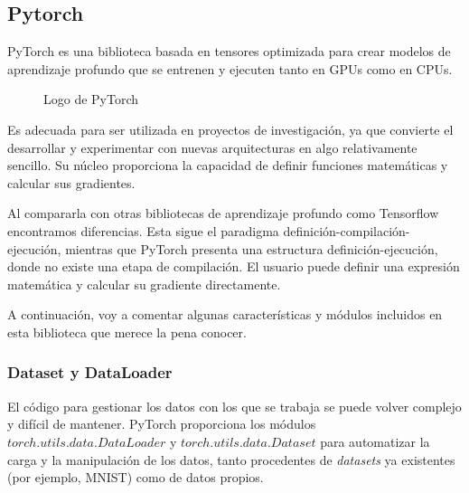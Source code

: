 \subsection{Pytorch} \label{pytorch} 
PyTorch es una biblioteca basada en tensores optimizada para crear modelos de aprendizaje profundo que se entrenen y ejecuten tanto en GPUs como en CPUs.

\begin{figure}[H]
\centering
    \caption{Logo de PyTorch}
\end{figure}

Es adecuada para ser utilizada en proyectos de investigación, ya que convierte el desarrollar y experimentar con nuevas arquitecturas en algo relativamente sencillo. Su núcleo proporciona la capacidad de definir funciones matemáticas y calcular sus gradientes.

Al compararla con otras bibliotecas de aprendizaje profundo como Tensorflow encontramos diferencias. Esta sigue el paradigma definición-compilación-ejecución, mientras que PyTorch presenta una estructura definición-ejecución, donde no existe una etapa de compilación. El usuario puede definir una expresión matemática y calcular su gradiente directamente. \cite{ketkar2017introduction}

A continuación, voy a comentar algunas características y módulos incluidos en esta biblioteca que merece la pena conocer.

\subsubsection{Dataset y DataLoader}
El código para gestionar los datos con los que se trabaja se puede volver complejo y difícil de mantener. PyTorch proporciona los módulos $torch.utils.data.DataLoader$ y $torch.utils.data.Dataset$ para automatizar la carga y la manipulación de los datos, tanto procedentes de \textit{datasets} ya existentes (por ejemplo, MNIST) como de datos propios.

